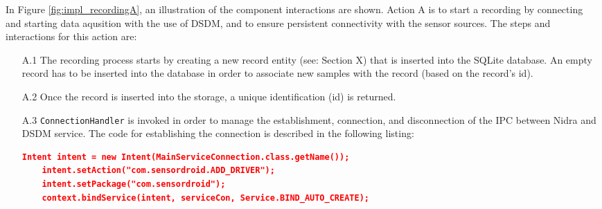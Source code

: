 In Figure \ref{fig:impl_recordingA}, an illustration of the component interactions are shown. Action A is to start a recording by connecting and starting data aqusition with the use of DSDM, and to ensure persistent connectivity with the sensor sources. The steps and interactions for this action are: 

\begin{itemize}
    \item[A.1] The recording process starts by creating a new record entity (see: Section X) that is inserted into the SQLite database. An empty record has to be inserted into the database in order to associate new samples with the record (based on the record's id). 
    \item[A.2] Once the record is inserted into the storage, a unique identification (id) is returned. 
    \item[A.3] \verb|ConnectionHandler| is invoked in order to manage the establishment, connection, and disconnection of the IPC between Nidra and DSDM service. The code for establishing the connection is described in the following listing:
\begin{lstlisting}[language=json, caption={Code snippet for connecting with the DSDM (MainServiceConnection is the AIDL file as discussed in Section X)}, captionpos=b]
    Intent intent = new Intent(MainServiceConnection.class.getName());
    intent.setAction("com.sensordroid.ADD_DRIVER");
    intent.setPackage("com.sensordroid");
    context.bindService(intent, serviceCon, Service.BIND_AUTO_CREATE);
\end{lstlisting}
    

\end{itemize}
